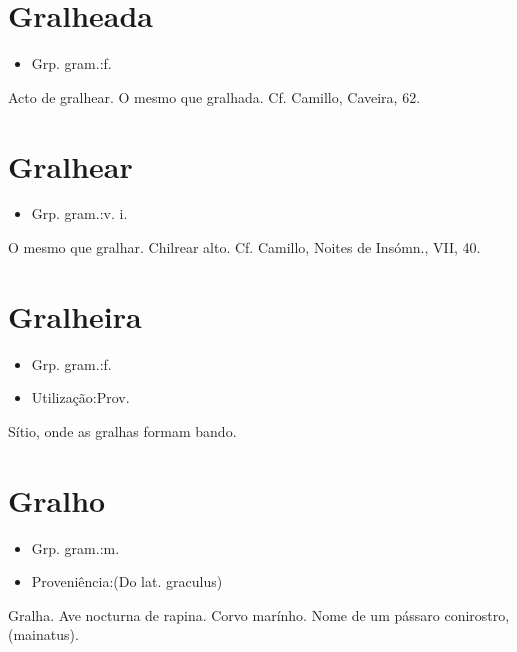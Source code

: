 \section{Gralheada}
\begin{itemize}
\item {Grp. gram.:f.}
\end{itemize}
Acto de gralhear.
O mesmo que \textunderscore gralhada\textunderscore . Cf. Camillo, \textunderscore Caveira\textunderscore , 62.
\section{Gralhear}
\begin{itemize}
\item {Grp. gram.:v. i.}
\end{itemize}
O mesmo que \textunderscore gralhar\textunderscore .
Chilrear alto. Cf. Camillo, \textunderscore Noites de Insómn.\textunderscore , VII, 40.
\section{Gralheira}
\begin{itemize}
\item {Grp. gram.:f.}
\end{itemize}
\begin{itemize}
\item {Utilização:Prov.}
\end{itemize}
Sítio, onde as gralhas formam bando.
\section{Gralho}
\begin{itemize}
\item {Grp. gram.:m.}
\end{itemize}
\begin{itemize}
\item {Proveniência:(Do lat. \textunderscore graculus\textunderscore )}
\end{itemize}
Gralha.
Ave nocturna de rapina.
Corvo marínho.
Nome de um pássaro conirostro, (\textunderscore mainatus\textunderscore ).
